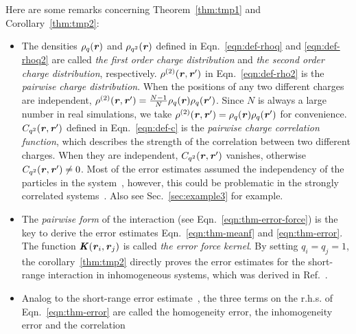 \documentclass[aps,pre,preprint,unsortedaddress]{revtex4}
\renewcommand{\v}[1]{\textbf{\textit{#1}}}
\begin{document}
Here are some remarks concerning Theorem~\ref{thm:tmp1} and Corollary~\ref{thm:tmp2}:
\begin{itemize}
\item The densities $\rho_q(\v r)$ and $\rho_{q^2}(\v r)$ defined in
  Eqn.~\eqref{eqn:def-rhoq} and \eqref{eqn:def-rhoq2} are called \emph{the
    first order charge distribution} and \emph{the
    second order charge distribution},
  respectively.
  $\rho^{(2)}(\v r, \v r')$ in Eqn.~\eqref{eqn:def-rho2}
  is the \emph{pairwise charge distribution}.
  When the positions of any two different charges are independent,
  $\rho^{(2)}(\v r, \v r') = \frac{N-1}{N}\rho_q(\v r)\rho_q(\v r')$.
  Since $N$ is always a large number in real simulations, we take
  $\rho^{(2)}(\v r, \v r') = \rho_q(\v r)\rho_q(\v r')$ for convenience.
  $C_{q^2}(\v r, \v r')$ defined in
  Eqn.~\eqref{eqn:def-c} is the \emph{pairwise charge correlation function},
  which describes the strength of the correlation between  two
  different charges. When they are independent, $C_{q^2}(\v r, \v r')$
  vanishes, otherwise $C_{q^2}(\v r, \v r') \neq 0$.
  Most of the error estimates assumed the independency of the
  particles in the system~\cite{kolafa1992cutoff, hummer1995numerical, deserno1998mue2, petersen1995accuracy, wang2010optimizing, neelov2010interlaced, ballenegger2012convert, wang2012},
  however, this could be problematic in the strongly correlated
  systems~\cite{deserno1998mue2, wang2010optimizing}.
  Also see Sec.~\ref{sec:example3} for example.
\item
  The \emph{pairwise form}
  of the interaction (see Eqn.~\eqref{eqn:thm-error-force}) is the key to derive
  the error estimates Eqn.~\eqref{eqn:thm-meanf} and \eqref{eqn:thm-error}.
  The function $\v K(\v r_i, \v r_j)$ is called \emph{the error force
    kernel}.
  By setting $q_i = q_j = 1$, the corollary~\ref{thm:tmp2} directly proves
  the error estimates for the short-range interaction
  in inhomogeneous systems, which was derived in Ref.~\cite{wang2012}. 
\item Analog to the short-range error estimate~\cite{wang2012}, the
  three terms on the r.h.s. of Eqn.~\eqref{eqn:thm-error} are called the
  homogeneity error, the inhomogeneity error and the correlation

\end{itemize}
\end{document}
